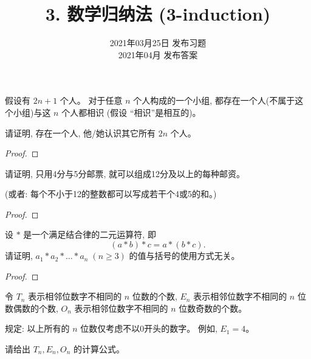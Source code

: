 \documentclass[a4paper, justified]{tufte-handout}
\title{3. 数学归纳法 (3-induction)}
\date{2021年03月25日 发布习题 \\ 2021年04月 发布答案}
\begin{document}
\maketitle
\noplagiarism %
\begin{abstract}
\end{abstract}
\beginrequired

\begin{problem}
  假设有 $2n + 1$ 个人。
  对于任意 $n$ 个人构成的一个小组,
  都存在一个人(不属于这个小组)与这 $n$ 个人都相识 (假设 ``相识''是相互的)。

  \noindent 请证明, 存在一个人, 他/她认识其它所有 $2n$ 个人。
\end{problem}

\begin{proof}
\end{proof}

\begin{problem}
  请证明, 只用4分与5分邮票, 就可以组成12分及以上的每种邮资。

  \noindent (或者: 每个不小于12的整数都可以写成若干个4或5的和。)
\end{problem}

\begin{proof}
\end{proof}

\begin{problem}
  设 $\ast$ 是一个满足结合律的二元运算符, 即
  \[
    (a \ast b) \ast c = a \ast (b \ast c).
  \]
  请证明, $a_{1} \ast a_{2} \ast \dots \ast a_{n}\; (n \ge 3)$
  的值与括号的使用方式无关。
\end{problem}

\begin{proof}
\end{proof}

\begin{problem}
  令 $T_{n}$ 表示相邻位数字不相同的 $n$ 位数的个数,
  $E_{n}$ 表示相邻位数字不相同的 $n$ 位数偶数的个数,
  $O_{n}$ 表示相邻位数字不相同的 $n$ 位数奇数的个数。

  \noindent 规定: 以上所有的 $n$ 位数仅考虑不以0开头的数字。
  例如, $E_{1} = 4$。

  \noindent 请给出 $T_{n}, E_{n}, O_{n}$ 的计算公式。
\end{problem}
\end{document}
